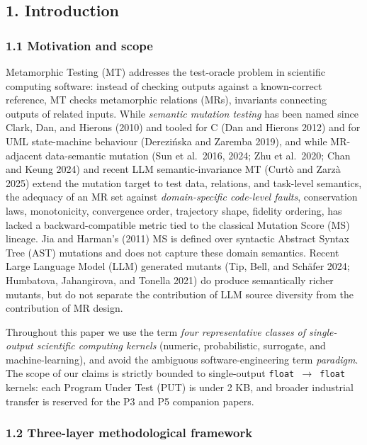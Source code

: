 \documentclass[review,12pt,authoryear]{elsarticle}
\begin{document}
\subsection{1. Introduction}\label{introduction}

\subsubsection{1.1 Motivation and scope}\label{motivation-and-scope}

Metamorphic Testing (MT) addresses the test-oracle problem in scientific
computing software: instead of checking outputs against a known-correct
reference, MT checks metamorphic relations (MRs), invariants connecting
outputs of related inputs. While \emph{semantic mutation testing} has
been named since Clark, Dan, and Hierons (2010) and tooled for C (Dan
and Hierons 2012) and for UML state-machine behaviour (Derezińska and
Zaremba 2019), and while MR-adjacent data-semantic mutation (Sun et
al.~2016, 2024; Zhu et al.~2020; Chan and Keung 2024) and recent LLM
semantic-invariance MT (Curtò and Zarzà 2025) extend the mutation target
to test data, relations, and task-level semantics, the adequacy of an MR
set against \emph{domain-specific code-level faults}, conservation laws,
monotonicity, convergence order, trajectory shape, fidelity ordering,
has lacked a backward-compatible metric tied to the classical Mutation
Score (MS) lineage. Jia and Harman's (2011) MS is defined over syntactic
Abstract Syntax Tree (AST) mutations and does not capture these domain
semantics. Recent Large Language Model (LLM) generated mutants (Tip,
Bell, and Schäfer 2024; Humbatova, Jahangirova, and Tonella 2021) do
produce semantically richer mutants, but do not separate the
contribution of LLM source diversity from the contribution of MR design.

Throughout this paper we use the term \emph{four representative classes
of single-output scientific computing kernels} (numeric, probabilistic,
surrogate, and machine-learning), and avoid the ambiguous
software-engineering term \emph{paradigm}. The scope of our claims is
strictly bounded to single-output \texttt{float\ $\to$\ float} kernels: each
Program Under Test (PUT) is under 2 KB, and broader industrial transfer
is reserved for the P3 and P5 companion papers.

\subsubsection{1.2 Three-layer methodological
framework}\label{three-layer-methodological-framework}
\end{document}
